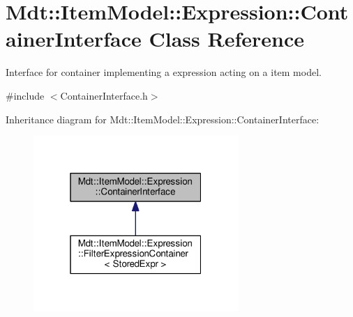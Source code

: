 \hypertarget{class_mdt_1_1_item_model_1_1_expression_1_1_container_interface}{}\section{Mdt\+:\+:Item\+Model\+:\+:Expression\+:\+:Container\+Interface Class Reference}
\label{class_mdt_1_1_item_model_1_1_expression_1_1_container_interface}


Interface for container implementing a expression acting on a item model.  




{\ttfamily \#include $<$Container\+Interface.\+h$>$}



Inheritance diagram for Mdt\+:\+:Item\+Model\+:\+:Expression\+:\+:Container\+Interface\+:
\nopagebreak
\begin{figure}[H]
\begin{center}
\leavevmode
\includegraphics[width=220pt]{class_mdt_1_1_item_model_1_1_expression_1_1_container_interface__inherit__graph}
\end{center}
\end{figure}
